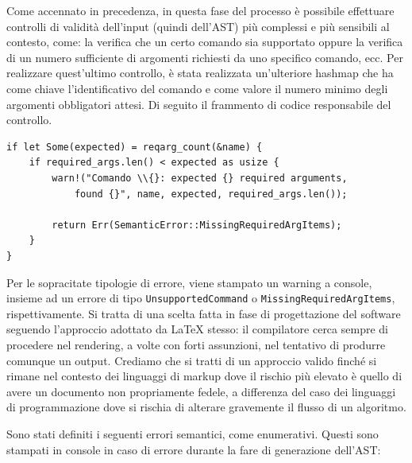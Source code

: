 \documentclass{article}
\begin{document}
    Come accennato in precedenza, in questa fase del processo è possibile effettuare controlli di validità dell'input (quindi dell'AST) più complessi e più sensibili al contesto, come: la verifica che un certo comando sia supportato oppure la verifica di un numero sufficiente di argomenti richiesti da uno specifico comando, ecc. Per realizzare quest'ultimo controllo, è stata realizzata un'ulteriore hashmap che ha come chiave l'identificativo del comando e come valore il numero minimo degli argomenti obbligatori attesi. Di seguito il frammento di codice responsabile del controllo.

    \begin{verbatim}
if let Some(expected) = reqarg_count(&name) {
    if required_args.len() < expected as usize {
        warn!("Comando \\{}: expected {} required arguments,
            found {}", name, expected, required_args.len());

        return Err(SemanticError::MissingRequiredArgItems);
    }
}
    \end{verbatim}

    Per le sopracitate tipologie di errore, viene stampato un warning a console, insieme ad un errore di tipo \texttt{UnsupportedCommand} o \texttt{MissingRequiredArgItems}, rispettivamente. Si tratta di una scelta fatta in fase di progettazione del software seguendo l'approccio adottato da LaTeX stesso: il compilatore cerca sempre di procedere nel rendering, a volte con forti assunzioni, nel tentativo di produrre comunque un output. Crediamo che si tratti di un approccio valido finché si rimane nel contesto dei linguaggi di markup dove il rischio più elevato è quello di avere un documento non propriamente fedele, a differenza del caso dei linguaggi di programmazione dove si rischia di alterare gravemente il flusso di un algoritmo.

    Sono stati definiti i seguenti errori semantici, come enumerativi. Questi sono stampati in console in caso di errore durante la fare di generazione dell'AST:
\end{document}
